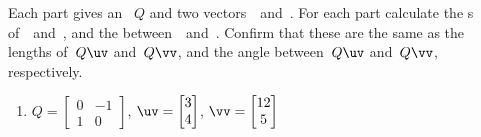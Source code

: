 \begin{exercise} \label{ex:preserve} 
Each part gives an ~\(Q\) and two vectors~\uv\ and~\vv.  
For each part calculate the s of~\uv\ and~\vv, and the  between~\uv\ and~\vv.
Confirm that these are the same as the lengths of~\(Q\uv\) and~\(Q\vv\), and the angle between~\(Q\uv\) and~\(Q\vv\), respectively.

\begin{enumerate}
\item \(Q=\begin{bmatrix} 0&-1\\1&0 \end{bmatrix}\), 
\(\uv=\begin{bmatrix} 3\\4 \end{bmatrix}\),
\(\vv=\begin{bmatrix} 12\\5 \end{bmatrix}\)



\end{enumerate}
\end{exercise}
